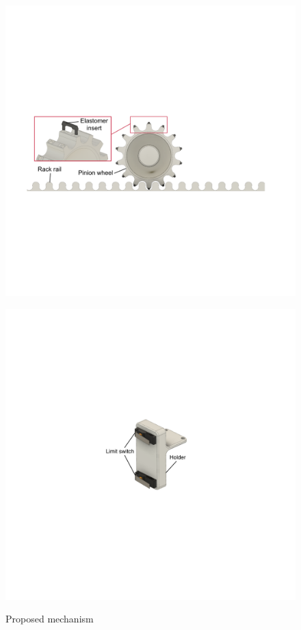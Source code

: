 \begin{figure}[tb]
  \begin{minipage}[b]{0.6\columnwidth}
  \centering
  \includegraphics[width=0.95\columnwidth]{figures/rack-pinion.pdf}
  \label{fig:rack-pinion}
 \end{minipage}%
 \begin{minipage}[b]{0.4\columnwidth}
  \centering
  \includegraphics[width=0.95\columnwidth]{figures/limit-switch.pdf}
  \label{fig:limit-switch}
 \end{minipage}
 \caption{Proposed mechanism}
 \label{fig:mechanism}
\end{figure}
